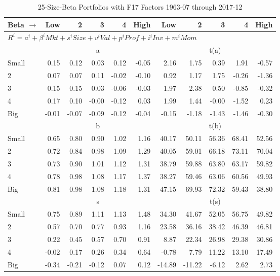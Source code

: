 
\begin{table}[!ht]
\footnotesize
\centering
\caption{25-Size-Beta Portfolios with F17 Factors 1963-07 through 2017-12}
\begin{tabular}{lrrrrrrrrrr}
  \toprule
    
    Beta $\rightarrow$ & Low & 2 & 3 & 4 & High & Low & 2 & 3 & 4 & High  \\ 
  \midrule
  \multicolumn{11}{l}{$R^i=a^i+\beta^iMkt+s^iSize+v^iVal+p^iProf+i^iInv+m^iMom$}  \\
  
     & \multicolumn{5}{c}{a} & \multicolumn{5}{c}{t(a)}   \\
     \cmidrule(r){2-6} \cmidrule(r){7-11} 
    Small  & 0.15  & 0.12  & 0.03  & 0.12  & -0.05  & 2.16  & 1.75  & 0.39  & 1.91  & -0.57   \\
    2  & 0.07  & 0.07  & 0.11  & -0.02  & -0.10  & 0.92  & 1.17  & 1.75  & -0.26  & -1.36   \\
    3  & 0.15  & 0.15  & 0.03  & -0.06  & -0.03  & 1.97  & 2.38  & 0.50  & -0.85  & -0.32   \\
    4  & 0.17  & 0.10  & -0.00  & -0.12  & 0.03  & 1.99  & 1.44  & -0.00  & -1.52  & 0.23   \\
    Big  & -0.01  & -0.07  & -0.09  & -0.12  & -0.04  & -0.15  & -1.18  & -1.43  & -1.46  & -0.30   \\
    
  
     & \multicolumn{5}{c}{b} & \multicolumn{5}{c}{t(b)}   \\
     \cmidrule(r){2-6} \cmidrule(r){7-11} 
    Small  & 0.65  & 0.80  & 0.90  & 1.02  & 1.16  & 40.17  & 50.11  & 56.36  & 68.41  & 52.56   \\
    2  & 0.72  & 0.84  & 0.98  & 1.09  & 1.29  & 40.05  & 59.01  & 66.18  & 73.11  & 70.04   \\
    3  & 0.73  & 0.90  & 1.01  & 1.12  & 1.31  & 38.79  & 59.88  & 63.80  & 63.17  & 59.82   \\
    4  & 0.78  & 0.98  & 1.08  & 1.17  & 1.37  & 38.27  & 59.46  & 63.06  & 60.56  & 49.93   \\
    Big  & 0.81  & 0.98  & 1.08  & 1.18  & 1.31  & 47.15  & 69.93  & 72.32  & 59.43  & 38.80   \\
    
  
     & \multicolumn{5}{c}{s} & \multicolumn{5}{c}{t(s)}   \\
     \cmidrule(r){2-6} \cmidrule(r){7-11} 
    Small  & 0.75  & 0.89  & 1.11  & 1.13  & 1.48  & 34.30  & 41.67  & 52.05  & 56.75  & 49.82   \\
    2  & 0.57  & 0.70  & 0.77  & 0.93  & 1.16  & 23.58  & 36.16  & 38.42  & 46.39  & 46.81   \\
    3  & 0.22  & 0.45  & 0.57  & 0.70  & 0.91  & 8.87  & 22.34  & 26.98  & 29.38  & 30.86   \\
    4  & -0.02  & 0.17  & 0.26  & 0.34  & 0.64  & -0.78  & 7.79  & 11.22  & 13.10  & 17.49   \\
    Big  & -0.34  & -0.21  & -0.12  & 0.07  & 0.12  & -14.89  & -11.22  & -6.12  & 2.62  & 2.73   \\
    

\end{tabular}
\end{table}
